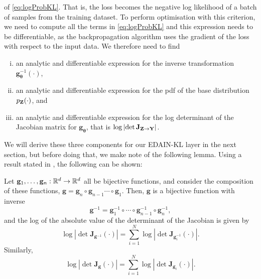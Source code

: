 \documentclass{statsmsc}
\begin{document}
{of \cref{eq:logProbKL}. That is, the loss becomes the negative log likelihood of a batch
of samples from the training dataset. To perform optimisation with this criterion,
we need to compute all the terms in \cref{eq:logProbKL} and this expression needs to
be differentiable, as the backpropagation algorithm uses the gradient of the loss
with respect to the input data.
We therefore need to find
\begin{enumerate}[(i)]
    \item  an analytic and differentiable expression for the inverse transformation
$\mathbf{g}_{\bm\theta}^{-1}\left(\cdot \right)$,
    \item  an analytic and differentiable expression for the \ac{pdf} of the base distribution
$p_{\mathbf{Z}}(\cdot)$, and
    \item an analytic and differentiable expression for the log determinant of the Jacobian matrix for $\mathbf{g}_{\bm\theta}$, that is
$\log \left|\det \mathbf{J}_{\mathbf{Z} \rightarrow {\mathbf{Y}}} \right|$.
\end{enumerate}
We will derive these three components for our \ac{EDAIN-KL} layer in the next section, but
before doing that, we make note of the following lemma.
Using a result stated in \citeauthor{normalizing_flows}, the following can be shown:
\begin{lemma}\label{thrm:normFlow}
    Let $\mathbf{g}_1,\dots, \mathbf{g}_n:\mathbb{R}^d \rightarrow {\mathbb{R}^d}$ all be bijective functions, and consider
    the composition of these functions, $\mathbf{g}=\mathbf{g}_n \circ \mathbf{g}_{n-1} \cdots \circ \mathbf{g}_1$.
    Then, $\mathbf{g}$ is a bijective function with inverse
    \begin{equation}
        \mathbf{g}^{-1}=\mathbf{g}_1^{-1} \circ \cdots \circ \mathbf{g}_{n-1}^{-1} \circ \mathbf{g}_n^{-1},
    \end{equation}
    and the log of the absolute value of the determinant of the Jacobian is given by
    \begin{equation}
        \log \left| \det \mathbf{J}_{\mathbf{g}^{-1}}(\cdot)\right|
        = \sum_{i=1}^N \log\left|\det \mathbf{J}_{\mathbf{g}_i^{-1}}(\cdot) \right|.
    \end{equation}
    Similarly,
    \begin{equation}
        \log \left| \det \mathbf{J}_{\mathbf{g}}(\cdot)\right|
        = \sum_{i=1}^N \log \left|\det \mathbf{J}_{\mathbf{g}_i}(\cdot) \right|.
    \end{equation}
\end{lemma}

}
\end{document}
